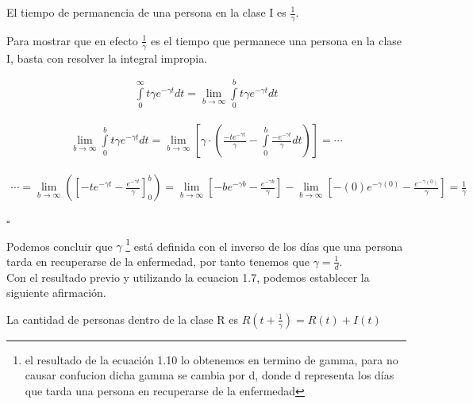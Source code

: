 \begin{Af}
El tiempo de permanencia de una persona en la clase I es $\frac{1}{\gamma}$. \cite{Martcheva}
\end{Af}

\begin{Dem}

Para mostrar que en efecto $\frac{1}{\gamma}$ es el tiempo que permanece una persona en la clase I, basta con resolver la integral impropia.

\begin{align*} 
\int \limits_{0}^{\infty} t\gamma e^{-\gamma t} dt = \lim\limits_{b\rightarrow \infty} \int \limits_{0}^{b} t\gamma e^{-\gamma t}dt 
\end{align*}

\begin{align*}
\lim\limits_{b\rightarrow \infty} \int \limits_{0}^{b} t\gamma e^{-\gamma t}dt = \lim\limits_{b\rightarrow \infty} \left[ \gamma \cdot \left( \frac{-t e^{-\gamma t}}{\gamma} - \int \limits_{0}^{b} \frac{-e^{-\gamma t}}{\gamma} dt \right)\right] = \cdots
\end{align*}

\begin{align*}
\cdots = \lim\limits_{b\rightarrow \infty} \left( \left[ -te^{- \gamma t} - \frac{e^{-\gamma t}}{\gamma} \right]_0^b \right) = \lim\limits_{b\rightarrow \infty} \left[ -be^{- \gamma b} - \frac{e^{- \gamma b}}{\gamma} \right] - \lim\limits_{b\rightarrow \infty} \left[ -(0)e^{- \gamma (0)} - \frac{e^{- \gamma (0)}}{\gamma} \right] = \frac{1}{\gamma}  \\
\end{align*}

\hfill	$\square$

\end{Dem}

Podemos concluir que $\gamma$ \footnote{el resultado de la ecuación 1.10 lo obtenemos en termino de gamma, para no causar confucion dicha gamma se cambia por d, donde d representa los días que tarda una persona en recuperarse de la enfermedad} está definida con el inverso de los días que una persona tarda en recuperarse de la enfermedad, por tanto tenemos que $\gamma = \frac{1}{d}$.\\

Con el resultado previo y utilizando la ecuacion 1.7, podemos establecer la siguiente afirmación.

\begin{Af}
La cantidad de personas dentro de la clase R es $R(t+\frac{1}{\gamma}) = R(t) + I(t)$
\end{Af}

